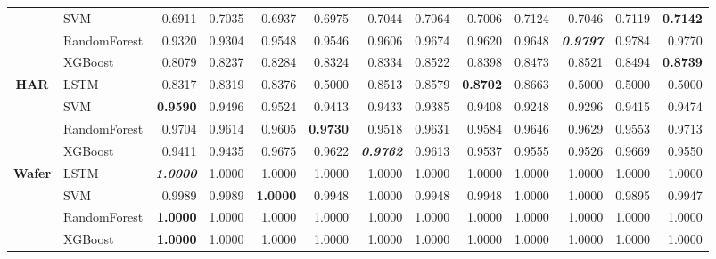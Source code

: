 \begin{table}[H]
\begin{adjustbox}{max width=12cm}
\begin{tabular}{|c|l|r|r|r|r|r|r|r|r|r|r|r|}
			                      & SVM          & 0.6911          & 0.7035 & 0.6937 & 0.6975          & 0.7044          & 0.7064          & 0.7006 & 0.7124 & 0.7046          & 0.7119 & \textbf{0.7142}          \\
			                      & RandomForest & 0.9320          & 0.9304 & 0.9548 & 0.9546          & 0.9606          & 0.9674          & 0.9620 & 0.9648 & \textit{\textbf{0.9797}} & 0.9784 & 0.9770          \\
			                      & XGBoost      & 0.8079          & 0.8237 & 0.8284 & 0.8324          & 0.8334          & 0.8522          & 0.8398 & 0.8473 & 0.8521          & 0.8494 & \textbf{0.8739}          \\
			\hline
			\textbf{HAR}          & LSTM         & 0.8317          & 0.8319 & 0.8376 & 0.5000          & 0.8513          & 0.8579          & \textbf{0.8702} & 0.8663 & 0.5000          & 0.5000 & 0.5000          \\
			                      & SVM          & \textbf{0.9590}          & 0.9496 & 0.9524 & 0.9413          & 0.9433          & 0.9385          & 0.9408 & 0.9248 & 0.9296          & 0.9415 & 0.9474          \\
			                      & RandomForest & 0.9704          & 0.9614 & 0.9605 & \textbf{0.9730} & 0.9518          & 0.9631          & 0.9584 & 0.9646 & 0.9629          & 0.9553 & 0.9713          \\
			                      & XGBoost      & 0.9411          & 0.9435 & 0.9675 & 0.9622          & \textit{\textbf{0.9762}}          & 0.9613          & 0.9537 & 0.9555 & 0.9526          & 0.9669 & 0.9550          \\
			\hline
			\textbf{Wafer}        & LSTM         & \textit{\textbf{1.0000}} & 1.0000 & 1.0000 & 1.0000          & 1.0000          & 1.0000          & 1.0000 & 1.0000 & 1.0000          & 1.0000 & 1.0000          \\
			                      & SVM          & 0.9989          & 0.9989 & \textbf{1.0000} & 0.9948          & 1.0000          & 0.9948          & 0.9948 & 1.0000 & 1.0000          & 0.9895 & 0.9947          \\
			                      & RandomForest & \textbf{1.0000}          & 1.0000 & 1.0000 & 1.0000          & 1.0000          & 1.0000          & 1.0000 & 1.0000 & 1.0000          & 1.0000 & 1.0000          \\
			                      & XGBoost      & \textbf{1.0000}          & 1.0000 & 1.0000 & 1.0000          & 1.0000          & 1.0000          & 1.0000 & 1.0000 & 1.0000          & 1.0000 & 1.0000          \\

\end{tabular}
\end{adjustbox}
\end{table}
